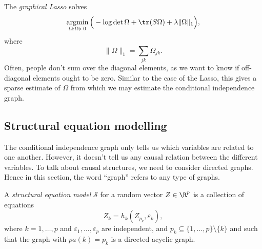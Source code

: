 \documentclass[a4paper]{article}
\DeclareMathOperator*\argmin{argmin}
\begin{document}
The \emph{graphical Lasso} solves
\[
  \argmin_{\Omega: \Omega \succ 0} \Big(-\log \det \Omega + \tr (S \Omega) + \lambda \|\Omega\|_1\Big),
\]
where
\[
  \|\Omega\|_1 = \sum_{jk} \Omega_{jk}.
\]
Often, people don't sum over the diagonal elements, as we want to know if off-diagonal elements ought to be zero. Similar to the case of the Lasso, this gives a sparse estimate of $\Omega$ from which we may estimate the conditional independence graph.

\subsection{Structural equation modelling}
The conditional independence graph only tells us which variables are related to one another. However, it doesn't tell us any causal relation between the different variables. To talk about causal structures, we need to consider directed graphs. Hence in this section, the word ``graph'' refers to any type of graphs.

\begin{defi}
  A \emph{structural equation model} $\mathcal{S}$ for a random vector $Z \in \R^p$ is a collection of equations
  \[
    Z_k = h_k(Z_{p_k}, \varepsilon_k),
  \]
  where $k = 1, \ldots, p$ and $\varepsilon_1, \ldots, \varepsilon_p$ are independent, and $p_k \subseteq \{1, \ldots, p\} \setminus \{k\}$ and such that the graph with $pa(k) = p_k$ is a directed acyclic graph.
\end{defi}
\end{document}
